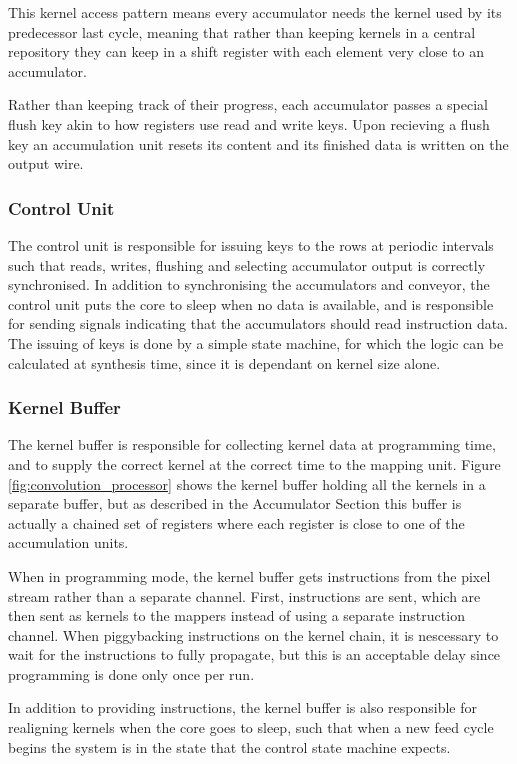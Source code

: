 This kernel access pattern means every accumulator needs the kernel used by its predecessor last cycle, meaning that rather than keeping kernels in a central repository they can keep in a shift register with each element very close to an accumulator.

Rather than keeping track of their progress, each accumulator passes a special flush key akin to how registers use read and write keys. Upon recieving a flush key an accumulation unit resets its content and its finished data is written on the output wire.

\subsubsection{Control Unit}
The control unit is responsible for issuing keys to the rows at periodic intervals such that reads, writes, flushing and selecting accumulator output is correctly synchronised.
In addition to synchronising the accumulators and conveyor, the control unit puts the core to sleep when no data is available, and is responsible for sending signals indicating that the accumulators should read instruction data.
The issuing of keys is done by a simple state machine, for which the logic can be calculated at synthesis time, since it is dependant on kernel size alone. 

\subsubsection{Kernel Buffer}
The kernel buffer is responsible for collecting kernel data at programming time, and to supply the correct kernel at the correct time to the mapping unit.
Figure \ref{fig:convolution_processor} shows the kernel buffer holding all the kernels in a separate buffer, but as described in the Accumulator Section this buffer is actually a chained set of registers where each register is close to one of the accumulation units.

When in programming mode, the kernel buffer gets instructions from the pixel stream rather than a separate channel.
First, instructions are sent, which are then sent as kernels to the mappers instead of using a separate instruction channel.
When piggybacking instructions on the kernel chain, it is nescessary to wait for the instructions to fully propagate, but this is an acceptable delay since programming is done only once per run.

In addition to providing instructions, the kernel buffer is also responsible for realigning kernels when the core goes to sleep, such that when a new feed cycle begins the system is in the state that the control state machine expects.


